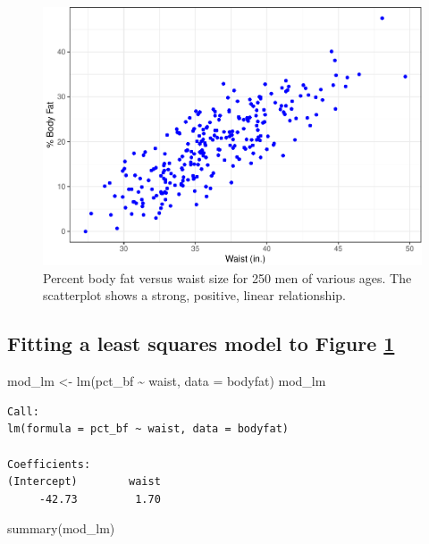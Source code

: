 \documentclass[
]{article}
\newenvironment{Shaded}{\begin{snugshade}}{\end{snugshade}}
\newcommand{\AttributeTok}[1]{\textcolor[rgb]{0.77,0.63,0.00}{#1}}
\newcommand{\FunctionTok}[1]{\textcolor[rgb]{0.00,0.00,0.00}{#1}}
\newcommand{\NormalTok}[1]{#1}
\newcommand{\OtherTok}[1]{\textcolor[rgb]{0.56,0.35,0.01}{#1}}
\newcommand{\SpecialCharTok}[1]{\textcolor[rgb]{0.00,0.00,0.00}{#1}}
\begin{document}
\begin{figure}

{\centering \includegraphics{CHAP23_files/figure-latex/fig231-1} 

}

\caption{Percent body fat versus waist size for 250 men of various ages.  The scatterplot shows a strong, positive, linear relationship.}\label{fig:fig231}
\end{figure}

\hypertarget{fitting-a-least-squares-model-to-figure-reffigfig231}{%
\subsection{Fitting a least squares model to Figure \ref{fig:fig231}}\label{fitting-a-least-squares-model-to-figure-reffigfig231}}

\begin{Shaded}
\begin{Highlighting}[]
\NormalTok{mod\_lm }\OtherTok{\textless{}{-}} \FunctionTok{lm}\NormalTok{(pct\_bf }\SpecialCharTok{\textasciitilde{}}\NormalTok{ waist, }\AttributeTok{data =}\NormalTok{ bodyfat)}
\NormalTok{mod\_lm}
\end{Highlighting}
\end{Shaded}

\begin{verbatim}
Call:
lm(formula = pct_bf ~ waist, data = bodyfat)

Coefficients:
(Intercept)        waist  
     -42.73         1.70  
\end{verbatim}

\begin{Shaded}
\begin{Highlighting}[]
\FunctionTok{summary}\NormalTok{(mod\_lm)}
\end{Highlighting}
\end{Shaded}
\end{document}
